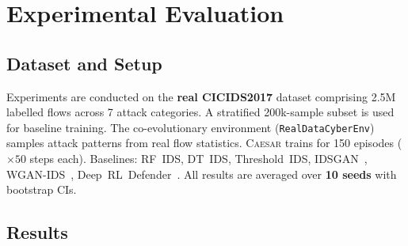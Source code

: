 \documentclass[conference]{IEEEtran}
\newcommand{\caesar}{\textsc{Caesar}}
\begin{document}
\section{Experimental Evaluation}

\subsection{Dataset and Setup}

Experiments are conducted on the \textbf{real CICIDS2017} dataset
\cite{sharafaldin2018} comprising 2.5M labelled flows across 7 attack
categories. A stratified 200k-sample subset is used for baseline training.
The co-evolutionary environment (\texttt{RealDataCyberEnv}) samples attack
patterns from real flow statistics.
\caesar{} trains for 150 episodes ($\times 50$ steps each).
Baselines: RF~IDS, DT~IDS, Threshold~IDS, IDSGAN~\cite{lin2018},
WGAN-IDS~\cite{ring2019}, Deep~RL~Defender~\cite{nguyen2021}.
All results are averaged over \textbf{10 seeds} with bootstrap CIs.

\subsection{Results}
\end{document}
